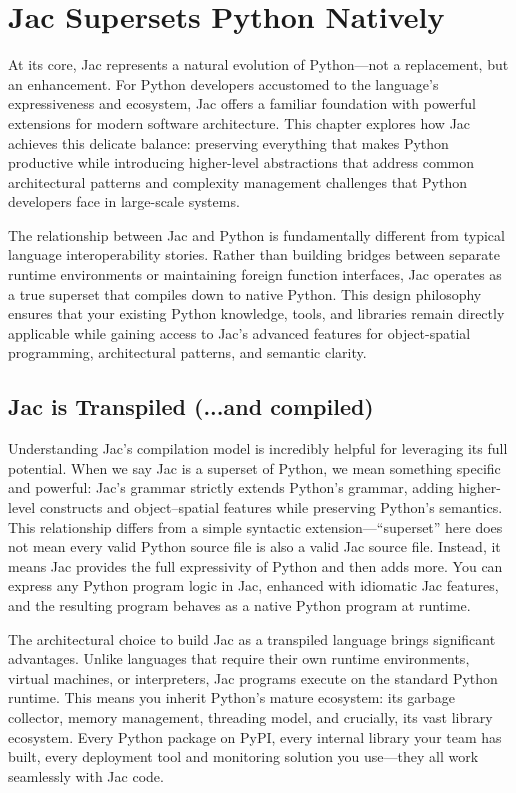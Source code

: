 \chapter{Jac Supersets Python Natively}

At its core, Jac represents a natural evolution of Python—not a replacement, but an enhancement. For Python developers accustomed to the language's expressiveness and ecosystem, Jac offers a familiar foundation with powerful extensions for modern software architecture. This chapter explores how Jac achieves this delicate balance: preserving everything that makes Python productive while introducing higher-level abstractions that address common architectural patterns and complexity management challenges that Python developers face in large-scale systems.

The relationship between Jac and Python is fundamentally different from typical language interoperability stories. Rather than building bridges between separate runtime environments or maintaining foreign function interfaces, Jac operates as a true superset that compiles down to native Python. This design philosophy ensures that your existing Python knowledge, tools, and libraries remain directly applicable while gaining access to Jac's advanced features for object-spatial programming, architectural patterns, and semantic clarity.

\section{Jac is Transpiled (...and compiled)}

Understanding Jac's compilation model is incredibly helpful for leveraging its full potential. When we say Jac is a superset of Python, we mean something specific and powerful: Jac's grammar strictly extends Python's grammar, adding higher-level constructs and object–spatial features while preserving Python's semantics. This relationship differs from a simple syntactic extension—``superset'' here does not mean every valid Python source file is also a valid Jac source file. Instead, it means Jac provides the full expressivity of Python and then adds more. You can express any Python program logic in Jac, enhanced with idiomatic Jac features, and the resulting program behaves as a native Python program at runtime.

The architectural choice to build Jac as a transpiled language brings significant advantages. Unlike languages that require their own runtime environments, virtual machines, or interpreters, Jac programs execute on the standard Python runtime. This means you inherit Python's mature ecosystem: its garbage collector, memory management, threading model, and crucially, its vast library ecosystem. Every Python package on PyPI, every internal library your team has built, every deployment tool and monitoring solution you use—they all work seamlessly with Jac code.

